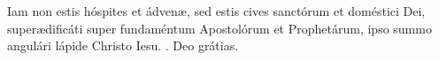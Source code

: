 \lettrine[lines=3]{I}{}am non estis hóspites et ádvenæ, sed estis cives sanctórum et doméstici Dei, superædificáti super fundaméntum Apostolórum et Pro\-phe\-tár\-um, ipso summo angulári lápide Christo Iesu. \Rbar. Deo grátias.
